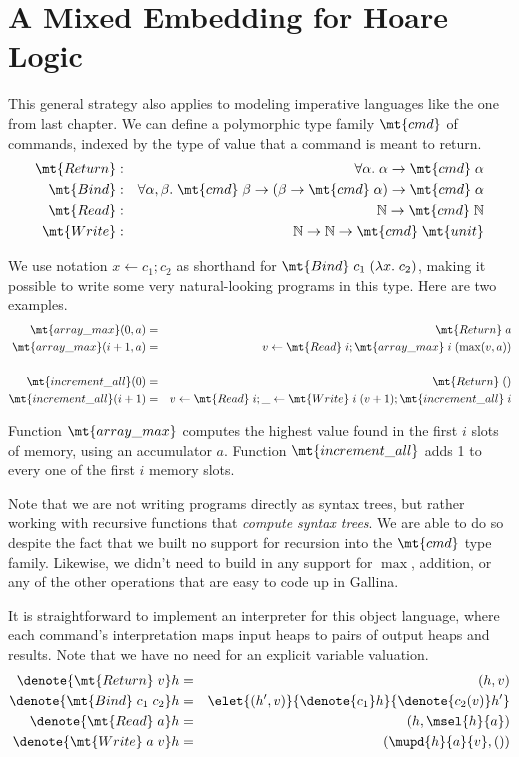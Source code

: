 \documentclass{amsbook}
\theoremstyle{definition}
\theoremstyle{remark}
\numberwithin{section}{chapter}
\numberwithin{equation}{chapter}
\begin{document}
\section{A Mixed Embedding for Hoare Logic}

This general strategy also applies to modeling imperative languages like the one from last chapter.
We can define a polymorphic type family $\mt{cmd}$ of commands, indexed by the type of value that a command is meant to return.
\encoding
\begin{eqnarray*}
  \mt{Return} &:& \forall \alpha. \; \alpha \to \mt{cmd} \; \alpha \\
  \mt{Bind} &:& \forall \alpha, \beta. \; \mt{cmd} \; \beta \to (\beta \to \mt{cmd} \; \alpha) \to \mt{cmd} \; \alpha \\
  \mt{Read} &:& \mathbb N \to \mt{cmd} \; \mathbb N \\
  \mt{Write} &:& \mathbb N \to \mathbb N \to \mt{cmd} \; \mt{unit}
\end{eqnarray*}

We use notation $x \leftarrow c_1; c_2$ as shorthand for $\mt{Bind} \; c_1 \; (\lambda x. \; c_2)$, making it possible to write some very natural-looking programs in this type.
Here are two examples.
\begin{eqnarray*}
  \mt{array\_max}(0, a) &=& \mt{Return} \; a \\
  \mt{array\_max}(i+1, a) &=& v \leftarrow \mt{Read} \; i; \mt{array\_max} \; i \; (\max(v, a)) \\
  \\
  \mt{increment\_all}(0) &=& \mt{Return} \; () \\
  \mt{increment\_all}(i+1) &=& v \leftarrow \mt{Read} \; i; \_ \leftarrow \mt{Write} \; i \; (v+1); \mt{increment\_all} \; i
\end{eqnarray*}

Function $\mt{array\_max}$ computes the highest value found in the first $i$ slots of memory, using an accumulator $a$.
Function $\mt{increment\_all}$ adds 1 to every one of the first $i$ memory slots.

Note that we are not writing programs directly as syntax trees, but rather working with recursive functions that \emph{compute syntax trees}.
We are able to do so despite the fact that we built no support for recursion into the $\mt{cmd}$ type family.
Likewise, we didn't need to build in any support for $\max$, addition, or any of the other operations that are easy to code up in Gallina.

It is straightforward to implement an interpreter for this object language, where each command's interpretation maps input heaps to pairs of output heaps and results.
Note that we have no need for an explicit variable valuation.
\begin{eqnarray*}
  \denote{\mt{Return} \; v}h &=& (h, v) \\
  \denote{\mt{Bind} \; c_1 \; c_2}h &=& \elet{(h', v)}{\denote{c_1}h}{\denote{c_2(v)}h'} \\
  \denote{\mt{Read} \; a}h &=& (h, \msel{h}{a}) \\
  \denote{\mt{Write} \; a \; v}h &=& (\mupd{h}{a}{v}, ())
\end{eqnarray*}
\end{document}
